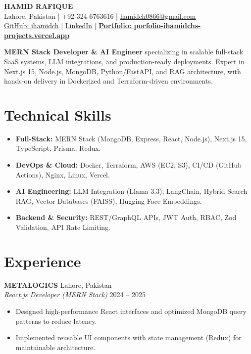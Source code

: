 \documentclass[a4paper,11pt]{article}
\begin{document}
\begin{center}
    {\Huge \textbf{HAMID RAFIQUE}}\\
    \vspace{4pt}
    Lahore, Pakistan \;|\; +92 324-6763616 \;|\;
    \href{mailto:hamidch0866@gmail.com}{hamidch0866@gmail.com}\\
    \href{https://github.com/ihamidch}{GitHub: ihamidch} \;|\;
    \href{https://linkedin.com/in/hamid-rafique-a75b9a3a5}{LinkedIn} \;|\;
    \textbf{\href{https://porfolio-ihamidchs-projects.vercel.app}{Portfolio: porfolio-ihamidchs-projects.vercel.app}}
\end{center}

\vspace{2pt}
\noindent
\textbf{MERN Stack Developer \& AI Engineer} specializing in scalable full-stack SaaS systems, LLM integrations, and production-ready deployments. Expert in Next.js 15, Node.js, MongoDB, Python/FastAPI, and RAG architecture, with hands-on delivery in Dockerized and Terraform-driven environments.

\section{Technical Skills}
\begin{itemize}
    \item \textbf{Full-Stack:} MERN Stack (MongoDB, Express, React, Node.js), Next.js 15, TypeScript, Prisma, Redux.
    \item \textbf{DevOps \& Cloud:} Docker, Terraform, AWS (EC2, S3), CI/CD (GitHub Actions), Nginx, Linux, Vercel.
    \item \textbf{AI Engineering:} LLM Integration (Llama 3.3), LangChain, Hybrid Search RAG, Vector Databases (FAISS), Hugging Face Embeddings.
    \item \textbf{Backend \& Security:} REST/GraphQL APIs, JWT Auth, RBAC, Zod Validation, API Rate Limiting.
\end{itemize}

\section{Experience}

\textbf{METALOGICS} \hfill Lahore, Pakistan \\
\textit{React.js Developer (MERN Stack)} \hfill 2024 -- 2025
\begin{itemize}
    \item Designed high-performance React interfaces and optimized MongoDB query patterns to reduce latency.
    \item Implemented reusable UI components with state management (Redux) for maintainable architecture.
\end{itemize}
\end{document}
